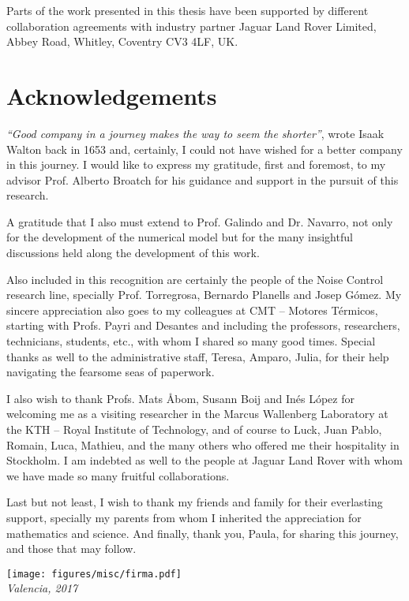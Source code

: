\documentclass[final,twoside,11pt]{book}
\makeatletter
\numberwithin{equation}{section}
\numberwithin{figure}{chapter}
\numberwithin{table}{chapter}
\def\cleardoublepage{\clearpage\if@twoside \ifodd\c@page\else
  \hbox{}
  \thispagestyle{empty}
  \newpage
  \if@twocolumn\hbox{}\newpage\fi\fi\fi}
\makeatother
\begin{document}
Parts of the work presented in this thesis have been supported by different collaboration agreements with industry partner Jaguar Land Rover Limited, Abbey Road, Whitley, Coventry CV3 4LF, UK. 

\cleardoublepage

\chapter*{Acknowledgements}
\enlargethispage{15mm}
\textit{``Good company in a journey makes the way to seem the shorter''}, wrote Isaak Walton back in 1653 and, certainly, I could not have wished for a better company in this journey. I would like to express my gratitude, first and foremost, to my advisor Prof. Alberto Broatch for his guidance and support in the pursuit of this research.

A gratitude that I also must extend to Prof. Galindo and Dr. Navarro, not only for the development of the numerical model but for the many insightful discussions held along the development of this work.

Also included in this recognition are certainly the people of the Noise Control research line, specially Prof. Torregrosa, Bernardo Planells and Josep Gómez. My sincere appreciation also goes to my colleagues at CMT -- Motores Térmicos, starting with Profs. Payri and Desantes and including the professors, researchers, technicians, students, etc., with whom I shared so many good times. Special thanks as well to the administrative staff, Teresa, Amparo, Julia, for their help navigating the fearsome seas of paperwork.

I also wish to thank Profs. Mats Åbom, Susann Boij and Inés López for welcoming me as a visiting researcher in the Marcus Wallenberg Laboratory at the KTH -- Royal Institute of Technology, and of course to Luck, Juan Pablo, Romain, Luca, Mathieu, and the many others who offered me their hospitality in Stockholm. I am indebted as well to the people at Jaguar Land Rover with whom we have made so many fruitful collaborations.

Last but not least, I wish to thank my friends and family for their everlasting support, specially my parents from whom I inherited the appreciation for mathematics and science. And finally, thank you, Paula, for sharing this journey, and those that may follow.\\[-1mm]

\hspace{0.72\textwidth}
\begin{minipage}[t]{0.3\textwidth}
\texttt{[image: figures/misc/firma.pdf]}\\[0mm]
\null\cabin\itshape\small\hspace{5mm} Valencia, 2017
\end{minipage}
\end{document}

